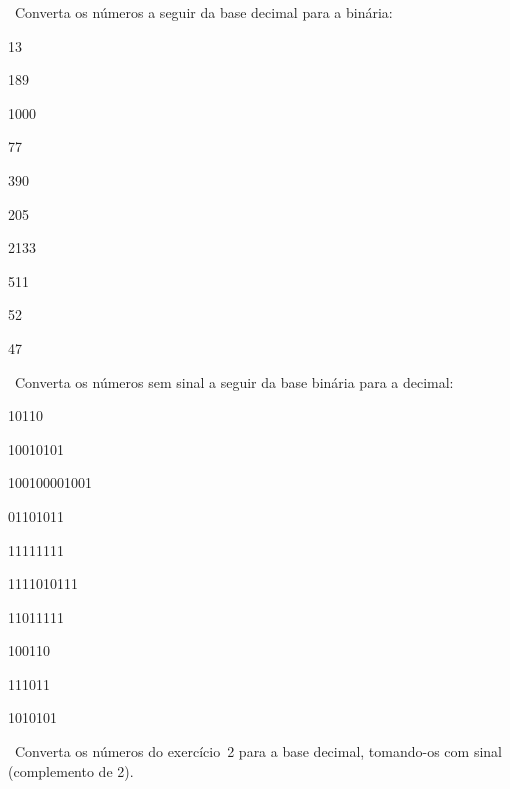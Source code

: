 \exercise\ Converta os números a seguir da base decimal 
para a binária:
\bigskip
\begin{enumerate}
\begin{minipage}{.35\textwidth}
\item 13
\item 189
\item 1000
\item 77
\item 390
\end{minipage}
\begin{minipage}{.35\textwidth}
\item 205
\item 2133
\item 511
\item 52
\item 47
\end{minipage}
\end{enumerate}

\exercise\ Converta os números sem sinal a seguir da base binária 
para a decimal:
\bigskip
\begin{enumerate}
  \begin{minipage}{.35\linewidth}
  \item 10110
  \item 10010101
  \item 100100001001
  \item 01101011
  \item 11111111
  \end{minipage}
  \begin{minipage}{.35\linewidth}
  \item 1111010111
  \item 11011111
  \item 100110
  \item 111011
  \item 1010101
  \end{minipage}
\end{enumerate}

\exercise\ Converta os números do exercício~2 para a base decimal,
tomando-os com sinal (complemento de 2).

